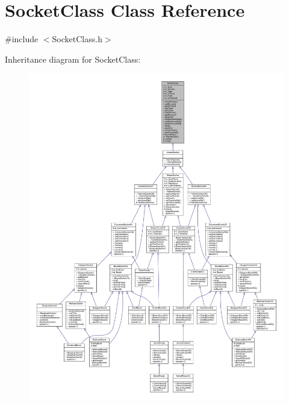 \hypertarget{classSocketClass}{}\section{Socket\+Class Class Reference}
\label{classSocketClass}


{\ttfamily \#include $<$Socket\+Class.\+h$>$}



Inheritance diagram for Socket\+Class\+:\nopagebreak
\begin{figure}[H]
\begin{center}
\leavevmode
\includegraphics[width=350pt]{classSocketClass__inherit__graph}
\end{center}
\end{figure}
